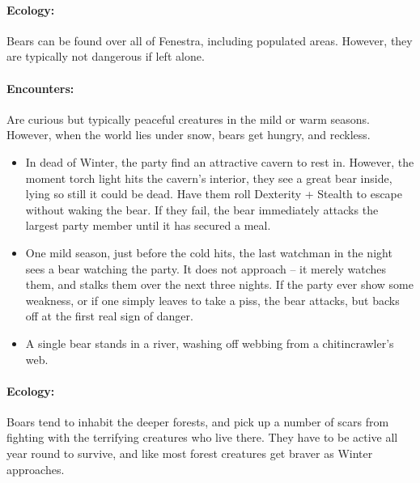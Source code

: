 \begin{multicols}{2}
\begin{itemize}
\end{itemize}

\label{bear}

\paragraph{Ecology:} Bears can be found over all of Fenestra, including populated areas.  However, they are typically not dangerous if left alone.

\bear

\paragraph{Encounters:} Are curious but typically peaceful creatures in the mild or warm seasons.
However, when the world lies under snow, bears get hungry, and reckless.

\begin{itemize}

  \item
  In dead of Winter, the party find an attractive cavern to rest in. However, the moment torch light hits the cavern's interior, they see a great bear inside, lying so still it could be dead.
  Have them roll Dexterity + Stealth to escape without waking the bear.
  If they fail, the bear immediately attacks the largest party member until it has secured a meal.
  \item
  One mild season, just before the cold hits, the last watchman in the night sees a bear watching the party.
  It does not approach -- it merely watches them, and stalks them over the next three nights.
  If the party ever show some weakness, or if one simply leaves to take a piss, the bear attacks, but backs off at the first real sign of danger.
  \item
  A single bear stands in a river, washing off webbing from a chitincrawler's web.

\end{itemize}

\label{boar}
\boar

\paragraph{Ecology:} Boars tend to inhabit the deeper forests, and pick up a number of scars from fighting with the terrifying creatures who live there.
They have to be active all year round to survive, and like most forest creatures get braver as Winter approaches.


\end{multicols}
